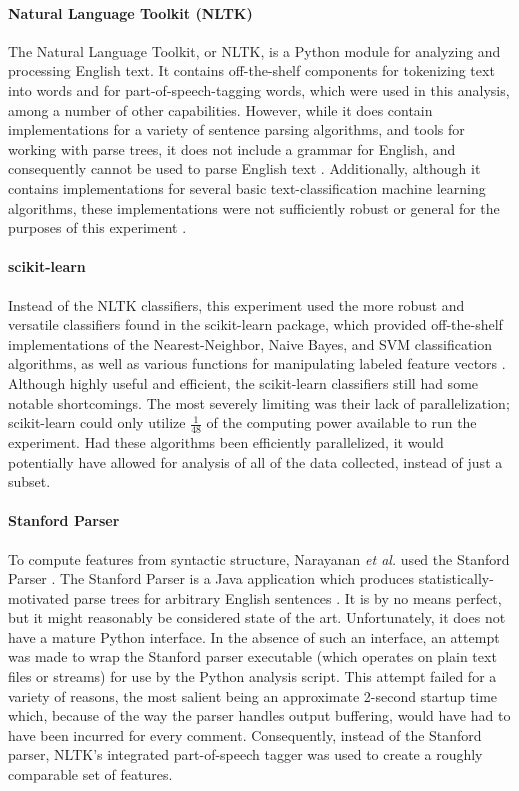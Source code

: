 \documentclass[12pt]{article}
\begin{document}
\paragraph{Natural Language Toolkit (NLTK)}
The Natural Language Toolkit, or NLTK, is a Python module for analyzing and processing English text. It contains off-the-shelf components for tokenizing text into words and for part-of-speech-tagging words, which were used in this analysis, among a number of other capabilities. However, while it does contain implementations for a variety of sentence parsing algorithms, and tools for working with parse trees, it does not include a grammar for English, and consequently cannot be used to parse English text \cite{bird2006nltk}. Additionally, although it contains implementations for several basic text-classification machine learning algorithms, these implementations were not sufficiently robust or general for the purposes of this experiment \cite{nltk2012classify}.

\paragraph{scikit-learn}
Instead of the NLTK classifiers, this experiment used the more robust and versatile classifiers found in the scikit-learn package, which provided off-the-shelf implementations of the Nearest-Neighbor, Naive Bayes, and SVM classification algorithms, as well as various functions for manipulating labeled feature vectors \cite{pedregosa2011scikit}. Although highly useful and efficient, the scikit-learn classifiers still had some notable shortcomings. The most severely limiting was their lack of parallelization; scikit-learn could only utilize $\frac{1}{48}$ of the computing power available to run the experiment. Had these algorithms been efficiently parallelized, it would potentially have allowed for analysis of all of the data collected, instead of just a subset.

\paragraph{Stanford Parser}
To compute features from syntactic structure, Narayanan \textit{et al.} used the Stanford Parser \cite{narayanan2012feasibility, klein2003accurate}. The Stanford Parser is a Java application which produces statistically-motivated parse trees for arbitrary English sentences \cite{klein2003accurate}. It is by no means perfect, but it might reasonably be considered state of the art. Unfortunately, it does not have a mature Python interface. In the absence of such an interface, an attempt was made to wrap the Stanford parser executable (which operates on plain text files or streams) for use by the Python analysis script. This attempt failed for a variety of reasons, the most salient being an approximate 2-second startup time which, because of the way the parser handles output buffering, would have had to have been incurred for every comment. Consequently, instead of the Stanford parser, NLTK's integrated part-of-speech tagger was used to create a roughly comparable set of features.
\end{document}
